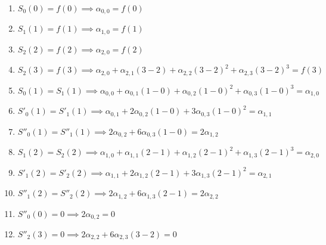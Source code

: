 \documentclass{article}
\begin{document}
\begin{enumerate}
    \item $S_0(0) = f(0) \implies \alpha_{0,0} = f(0)$
    \item $S_1(1) = f(1) \implies \alpha_{1,0} = f(1)$
    \item $S_2(2) = f(2) \implies \alpha_{2,0} = f(2)$
    \item $S_2(3) = f(3) \implies \alpha_{2,0} + \alpha_{2,1}(3-2) + \alpha_{2,2}(3-2)^2 + \alpha_{2,3}(3-2)^3 = f(3)$
    \item $S_0(1) = S_1(1) \implies \alpha_{0,0} + \alpha_{0,1}(1-0) + \alpha_{0,2}(1-0)^2 + \alpha_{0,3}(1-0)^3 = \alpha_{1,0}$
    \item $S'_0(1) = S'_1(1) \implies \alpha_{0,1} + 2\alpha_{0,2}(1-0) + 3\alpha_{0,3}(1-0)^2 = \alpha_{1,1}$
    \item $S''_0(1) = S''_1(1) \implies 2\alpha_{0,2} + 6\alpha_{0,3}(1-0) = 2\alpha_{1,2}$
    \item $S_1(2) = S_2(2) \implies \alpha_{1,0} + \alpha_{1,1}(2-1) + \alpha_{1,2}(2-1)^2 + \alpha_{1,3}(2-1)^3 = \alpha_{2,0}$
    \item $S'_1(2) = S'_2(2) \implies \alpha_{1,1} + 2\alpha_{1,2}(2-1) + 3\alpha_{1,3}(2-1)^2 = \alpha_{2,1}$
    \item $S''_1(2) = S''_2(2) \implies 2\alpha_{1,2} + 6\alpha_{1,3}(2-1) = 2\alpha_{2,2}$
    \item $S''_0(0) = 0 \implies 2\alpha_{0,2} = 0$
    \item $S''_2(3) = 0 \implies 2\alpha_{2,2} + 6\alpha_{2,3}(3-2) = 0$
\end{enumerate}

\end{document}
